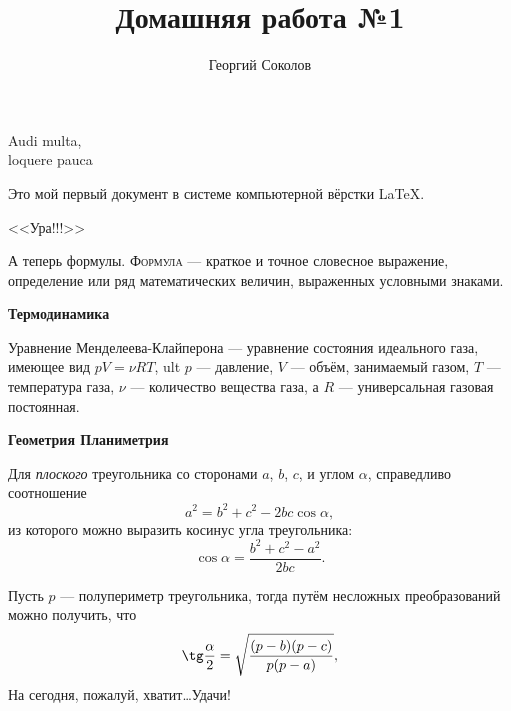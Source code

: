 \documentclass[12pt]{article}
\title{Домашняя работа №1}
\author{Георгий Соколов}
\date{}
\begin{document}
	\maketitle
	\vspace{20 pt}
	\begin{flushright}
		\begin{itshape}
			Audi multa,\\
			loquere pauca\\
		\end{itshape}
	\end{flushright}
	Это мой первый документ в системе компьютерной вёрстки \LaTeX.

 	\begin{center}
	{
		\huge <<Ура!!!>>\\
	}
	\end{center}

	А теперь формулы. {\scshape Формула} --- краткое и точное словесное 			выражение, определение или ряд математических величин, выраженных 		условными знаками.

	\vspace{15 pt}
	\hspace{28 pt} {\large \bfseries Термодинамика}

	Уравнение Менделеева-Клайперона --- уравнение состояния идеального газа, имеющее вид $pV = \nu RT$, ult $p$ --- давление, $V$ --- объём, занимаемый газом, $T$ --- температура газа, $\nu$ --- количество вещества газа, а $R$ --- универсальная газовая постоянная.
	
	\vspace{15 pt}
	\hspace{28 pt} {\large \bfseries Геометрия \hfill Планиметрия}

	Для {\itshape плоского} треугольника со сторонами $a$, $b$, $c$, и углом $\alpha$, справедливо соотношение
	$$
	a^2=b^2+c^2-2bc \cos \alpha,
	$$
	из которого можно выразить косинус угла треугольника:
	$$
	\cos \alpha = \frac{b^2 + c^2 - a^2}{2bc}.
	$$

	Пусть $p$ --- полупериметр треугольника, тогда путём несложных преобразований можно получить, что
	$$
	\tg \frac{\alpha}{2} = \sqrt{\frac{(p-b)(p-c)}{p(p-a)}},
	$$
	\vspace{1 cm}
	На сегодня, пожалуй, хватит\dots Удачи!
\end{document}
